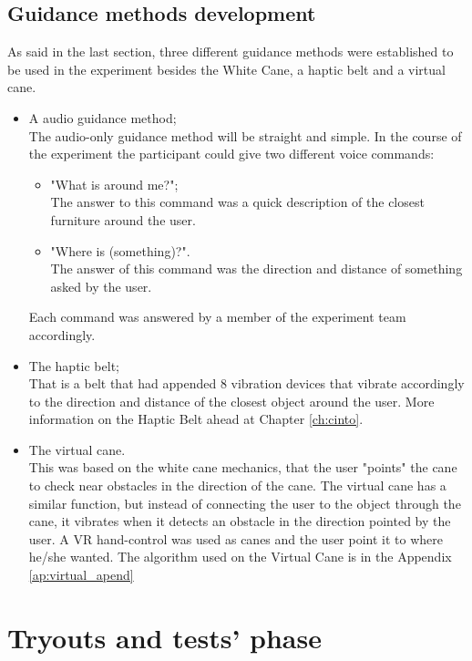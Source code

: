     \subsection{Guidance methods development}
        As said in the last section, three different guidance methods were established to be used in the experiment besides the White Cane, a haptic belt and a virtual cane.
        \begin{itemize}
            \item A audio guidance method; \\ The audio-only guidance method will be straight and simple. In the course of the experiment the participant could give two different voice commands:
            \begin{itemize}
                \item  "What is around me?"; \\ The answer to this command was a quick description of the closest furniture around the user.
                \item  "Where is (something)?". \\ The answer of this command was the direction and distance of something asked by the user.
            \end{itemize}
            Each command was answered by a member of the experiment team accordingly.
            
            \item The haptic belt; \\
            That is a belt that had appended 8 vibration devices that vibrate accordingly to the direction and distance of the closest object around the user. More information on the Haptic Belt ahead at Chapter \ref{ch:cinto}.
            
            \item The virtual cane. \\ 
            This was based on the white cane mechanics, that the user "points" the cane to check near obstacles in the direction of the cane. The virtual cane has a similar function, but instead of connecting the user to the object through the cane, it vibrates when it detects an obstacle in the direction pointed by the user. A VR hand-control was used as canes and the user point it to where he/she wanted. The algorithm used on the Virtual Cane is in the Appendix \ref{ap:virtual_apend}
        \end{itemize}
    

\section{Tryouts and tests' phase}
\label{sec:tests_phase}
        
